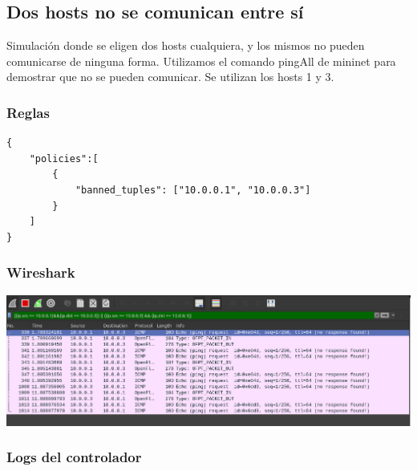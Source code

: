 \documentclass{article}
\begin{document}
\subsection{Dos hosts no se comunican entre sí}
Simulación donde se eligen dos hosts cualquiera, y los mismos no pueden comunicarse de ninguna forma. Utilizamos el comando pingAll de mininet para demostrar que no se pueden comunicar. Se utilizan los hosts 1 y 3.

\subsubsection{Reglas}
\begin{verbatim}
{
    "policies":[
        {
            "banned_tuples": ["10.0.0.1", "10.0.0.3"]
        }
    ]
}
\end{verbatim}

\subsubsection{Wireshark}
\begin{center}
\includegraphics[scale=0.35]{Banned_Tuple_WS.png}
\end{center}


\subsubsection{Logs del controlador}
\begin{center}
  \inputminted[fontsize=\footnotesize]{text}{informe/logs/Banned_Tuple_Log.txt}
\end{center}
\end{document}
